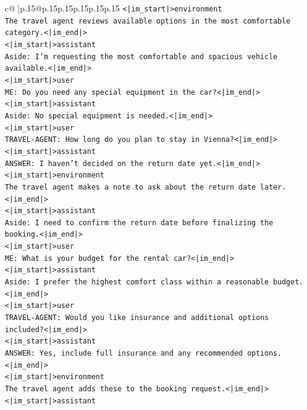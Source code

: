 \documentclass{article}
\begin{document}
{\begin{supertabular}{c@{$\;$}|p{.15\linewidth}@{}p{.15\linewidth}p{.15\linewidth}p{.15\linewidth}p{.15\linewidth}p{.15\linewidth}}
{{{\texttt{<|im\_start|>environment} \\
\texttt{The travel agent reviews available options in the most comfortable category.<|im\_end|>} \\
\texttt{<|im\_start|>assistant} \\
\texttt{Aside: I'm requesting the most comfortable and spacious vehicle available.<|im\_end|>} \\
\texttt{<|im\_start|>user} \\
\texttt{ME: Do you need any special equipment in the car?<|im\_end|>} \\
\texttt{<|im\_start|>assistant} \\
\texttt{Aside: No special equipment is needed.<|im\_end|>} \\
\texttt{<|im\_start|>user} \\
\texttt{TRAVEL{-}AGENT: How long do you plan to stay in Vienna?<|im\_end|>} \\
\texttt{<|im\_start|>assistant} \\
\texttt{ANSWER: I haven't decided on the return date yet.<|im\_end|>} \\
\texttt{<|im\_start|>environment} \\
\texttt{The travel agent makes a note to ask about the return date later.<|im\_end|>} \\
\texttt{<|im\_start|>assistant} \\
\texttt{Aside: I need to confirm the return date before finalizing the booking.<|im\_end|>} \\
\texttt{<|im\_start|>user} \\
\texttt{ME: What is your budget for the rental car?<|im\_end|>} \\
\texttt{<|im\_start|>assistant} \\
\texttt{Aside: I prefer the highest comfort class within a reasonable budget.<|im\_end|>} \\
\texttt{<|im\_start|>user} \\
\texttt{TRAVEL{-}AGENT: Would you like insurance and additional options included?<|im\_end|>} \\
\texttt{<|im\_start|>assistant} \\
\texttt{ANSWER: Yes, include full insurance and any recommended options.<|im\_end|>} \\
\texttt{<|im\_start|>environment} \\
\texttt{The travel agent adds these to the booking request.<|im\_end|>} \\
\texttt{<|im\_start|>assistant} \\
}}}
\end{supertabular}}
\end{document}
